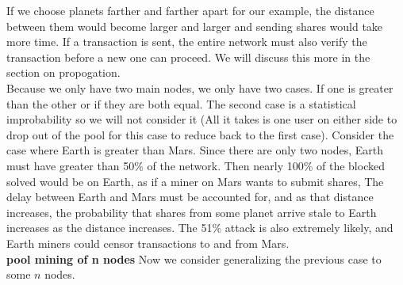 \documentclass[conference]{IEEEtran}
\begin{document}
If we choose planets farther and farther apart for our example, the distance between them would become larger and larger and sending shares would take more time. If a transaction is sent, the entire network must also verify the transaction before a new one can proceed. We will discuss this more in the section on propogation. \cite{template}\\
Because we only have two main nodes, we only have two cases. If one is greater than the other or if they are both equal. The second case is a statistical improbability so we will not consider it (All it takes is one user on either side to drop out of the pool for this case to reduce back to the first case). Consider the case where Earth is greater than Mars. Since there are only two nodes, Earth must have greater than 50\% of the network. Then nearly 100\% of the blocked solved would be on Earth, as if a miner on Mars wants to submit shares, The delay between Earth and Mars must be accounted for, and as that distance increases, the probability that shares from some planet arrive stale to Earth increases as the distance increases. The 51\% attack is also extremely likely, and Earth miners could censor transactions to and from Mars.\\
\textbf{pool mining of n nodes} Now we consider generalizing the previous case to some $n$ nodes. 

\end{document}
